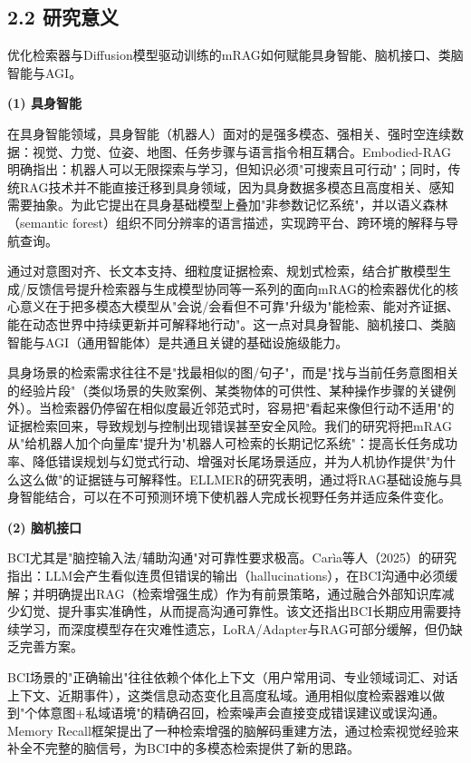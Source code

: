 \documentclass[12pt,a4paper]{article}
\begin{document}
\subsection*{2.2 研究意义}

优化检索器与Diffusion模型驱动训练的mRAG如何赋能具身智能、脑机接口、类脑智能与AGI。

\textbf{(1) 具身智能}

在具身智能领域，具身智能（机器人）面对的是强多模态、强相关、强时空连续数据：视觉、力觉、位姿、地图、任务步骤与语言指令相互耦合。Embodied-RAG明确指出：机器人可以无限探索与学习，但知识必须"可搜索且可行动"；同时，传统RAG技术并不能直接迁移到具身领域，因为具身数据多模态且高度相关、感知需要抽象\cite{xie2024embodiedrag}。为此它提出在具身基础模型上叠加"非参数记忆系统"，并以语义森林（semantic forest）组织不同分辨率的语言描述，实现跨平台、跨环境的解释与导航查询。

通过对意图对齐、长文本支持、细粒度证据检索、规划式检索，结合扩散模型生成/反馈信号提升检索器与生成模型协同等一系列的面向mRAG的检索器优化的核心意义在于把多模态大模型从"会说/会看但不可靠"升级为"能检索、能对齐证据、能在动态世界中持续更新并可解释地行动"。这一点对具身智能、脑机接口、类脑智能与AGI（通用智能体）是共通且关键的基础设施级能力。

具身场景的检索需求往往不是"找最相似的图/句子"，而是"找与当前任务意图相关的经验片段"（类似场景的失败案例、某类物体的可供性、某种操作步骤的关键例外）。当检索器仍停留在相似度最近邻范式时，容易把"看起来像但行动不适用"的证据检索回来，导致规划与控制出现错误甚至安全风险。我们的研究将把mRAG从"给机器人加个向量库"提升为"机器人可检索的长期记忆系统"：提高长任务成功率、降低错误规划与幻觉式行动、增强对长尾场景适应，并为人机协作提供"为什么这么做"的证据链与可解释性。ELLMER的研究表明，通过将RAG基础设施与具身智能结合，可以在不可预测环境下使机器人完成长视野任务并适应条件变化\cite{mon2024ellmer}。

\textbf{(2) 脑机接口}

BCI尤其是"脑控输入法/辅助沟通"对可靠性要求极高。Carìa等人（2025）的研究指出：LLM会产生看似连贯但错误的输出（hallucinations），在BCI沟通中必须缓解；并明确提出RAG（检索增强生成）作为有前景策略，通过融合外部知识库减少幻觉、提升事实准确性，从而提高沟通可靠性\cite{caria2025bci}。该文还指出BCI长期应用需要持续学习，而深度模型存在灾难性遗忘，LoRA/Adapter与RAG可部分缓解，但仍缺乏完善方案。

BCI场景的"正确输出"往往依赖个体化上下文（用户常用词、专业领域词汇、对话上下文、近期事件），这类信息动态变化且高度私域。通用相似度检索器难以做到"个体意图+私域语境"的精确召回，检索噪声会直接变成错误建议或误沟通。Memory Recall框架提出了一种检索增强的脑解码重建方法，通过检索视觉经验来补全不完整的脑信号，为BCI中的多模态检索提供了新的思路\cite{zhao2025memoryrecall}。
\end{document}
